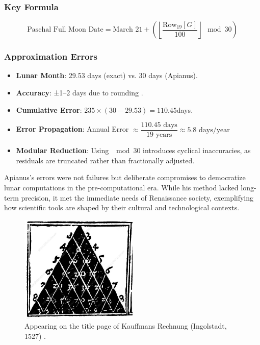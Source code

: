 \documentclass{article}
\begin{document}
\subsubsection{Key Formula}
\[
\boxed{\text{Paschal Full Moon Date} = \text{March 21} + \left( \left\lfloor \frac{\text{Row}_{19}[G]}{100} \right\rfloor \mod 30 \right)}
\]

\subsubsection{Approximation Errors}
\begin{itemize}
\item \textbf{Lunar Month}: 29.53 days (exact) vs. 30 days (Apianus).
\item \textbf{Accuracy}: ±1–2 days due to rounding \citep{meeus1991}.
\item \textbf{Cumulative Error}: \(235\times (30-29.53)=110.45\)days.
\item \textbf{Error Propagation}: Annual Error $\approx \dfrac{110.45\text{ days}}{19\text{ years}}\approx 5.8 \text{ days/year}$
\item \textbf{Modular Reduction}: Using $\mod{30}$ introduces cyclical inaccuracies, as residuals are truncated rather than fractionally adjusted.
\end{itemize}

Apianus’s errors were not failures but deliberate compromises to democratize lunar computations in the pre-computational era. While his method lacked long-term precision, it met the immediate needs of Renaissance society, exemplifying how scientific tools are shaped by their cultural and technological contexts.

\begin{figure}[h!tbp]
\centering
\includegraphics[width=0.5\textwidth]{Essay/Draft_2/Apianus.jpg}
\caption{Appearing on the title page of Kauffmans Rechnung (Ingolstadt, 1527) \citep{boyer1950}.}
\label{fig:apianus}
\end{figure}
\end{document}
